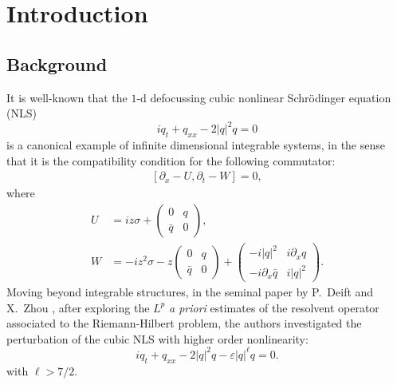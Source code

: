 \documentclass{amsart}
\theoremstyle{plain}
\theoremstyle{remark}
\numberwithin{equation}{section}
\newcommand{\eps}{\varepsilon}
\begin{document}
\maketitle



\section{Introduction}

\subsection{Background}
It is well-known that the $1$-d defocussing cubic nonlinear Schr\"odinger equation (NLS)
\begin{equation}
\label{eq:nls}
    iq_t+q_{xx}-2|q|^2q=0
\end{equation}
is a canonical example of  infinite dimensional integrable systems,  in the sense that it is the compatibility condition for the following commutator:
\begin{align}
\label{eq: compat}
    \left[\partial_x-U, \partial_t-W\right]=0,
\end{align}
where
\begin{align*}
U & =i z \sigma+\left(\begin{array}{cc}
0 & q \\
\bar{q} & 0
\end{array}\right), \\
W & =-i z^2 \sigma-z\left(\begin{array}{cc}
0 & q \\
\bar{q} & 0
\end{array}\right)+\left(\begin{array}{cc}
-i|q|^2 & i \partial_x q \\
-i \partial_x \bar{q} & i|q|^2
\end{array}\right).
\end{align*}
Moving beyond integrable structures, in the seminal paper by P.~Deift and X.~Zhou \cite{DZ-2}, after exploring the $L^p$ \emph{a priori} estimates of the resolvent operator associated to the Riemann-Hilbert problem, the authors investigated the perturbation of the cubic NLS with higher order nonlinearity:
\begin{equation}
    iq_t+q_{xx}-2|q|^2q-\eps|q|^\ell q=0.
\end{equation}
with $\ell>7/2$. 
\end{document}
